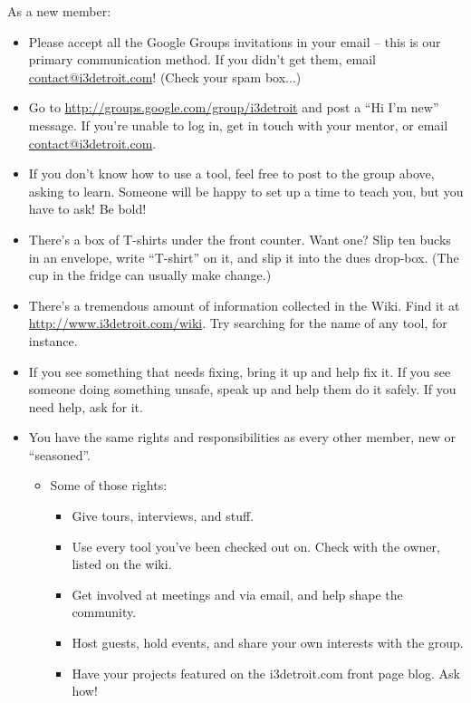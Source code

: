 \documentclass[10pt,letterpaper]{article}
\begin{document}
\noindent
As a new member:
    \begin{itemize}
        \item Please accept all the Google Groups invitations in your email -- this is our primary communication method. If you didn't get them, email \href{mailto:contact@i3detroit.com}{contact@i3detroit.com}! (Check your spam box...)
        \item Go to \url{http://groups.google.com/group/i3detroit} and post a ``Hi I'm new'' message. If you're unable to log in, get in touch with your mentor, or email \href{mailto:contact@i3detroit.com}{contact@i3detroit.com}.
        \item If you don't know how to use a tool, feel free to post to the group above, asking to learn. Someone will be happy to set up a time to teach you, but you have to ask! Be bold!
        \item There's a box of T-shirts under the front counter. Want one? Slip ten bucks in an envelope, write ``T-shirt'' on it, and slip it into the dues drop-box. (The cup in the fridge can usually make change.)
        \item There's a tremendous amount of information collected in the Wiki. Find it at \url{http://www.i3detroit.com/wiki}. Try searching for the name of any tool, for instance.
        \item If you see something that needs fixing, bring it up and help fix it. If you see someone doing something unsafe, speak up and help them do it safely. If you need help, ask for it.
        \item You have the same rights and responsibilities as every other member, new or ``seasoned''.
            \begin{itemize}
                \item Some of those rights:
                \begin{itemize}
                    \item Give tours, interviews, and stuff.
                    \item Use every tool you've been checked out on. Check with the owner, listed on the wiki.
                    \item Get involved at meetings and via email, and help shape the community.
                    \item Host guests, hold events, and share your own interests with the group.
                    \item Have your projects featured on the i3detroit.com front page blog. Ask how!

\end{itemize}
\end{itemize}
\end{itemize}
\end{document}

